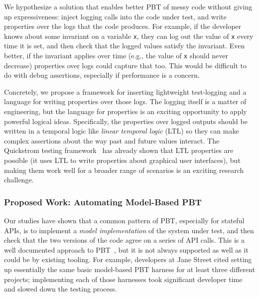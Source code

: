 We hypothesize a solution that enables better PBT of messy
code without giving
up expressiveness: inject logging calls into the code under test, and write
properties over the logs that the code produces. For example, if the developer
knows about some invariant on a variable \lstinline{x}, they can log out the
value of \lstinline{x} every time it is set, and then check that the logged
values satisfy the invariant. Even better, if the invariant applies over time
(e.g., the value of \lstinline{x} should never decrease) properties over logs
could capture that too. This would be difficult to do with debug assertions,
especially if performance is a concern.

Concretely, we propose a framework for inserting lightweight test-logging and a
language for writing properties over those logs. The logging itself is a matter
of engineering, but the language for properties is an exciting opportunity to
apply powerful logical ideas. Specifically, the properties over logged outputs
should be written in a temporal logic like {\em linear temporal logic} (LTL) so
they can make complex assertions about the way past and future values interact.
The Quickstrom testing framework~\cite{oconnor_quickstrom_2022} has already shown that
LTL properties are possible (it uses LTL to write properties about graphical
user interfaces), but making them work well for a broader range of scenarios is
an exciting research challenge.


\subsubsection{Proposed Work: Automating Model-Based PBT}
Our studies have shown that a common pattern of PBT, especially for stateful
APIs, is to implement a {\em model implementation} of the system under test, and
then check that the two versions of the code agree on a series of API calls.
This is a well documented approach to PBT~\cite{hughes_experiences_2016}, but it
is not always supported as well as it could be by existing tooling. For example,
developers at Jane Street cited setting up essentially the same basic
model-based PBT harness for at least three different projects; implementing each
of those harnesses took significant developer time and slowed down the testing
process.

